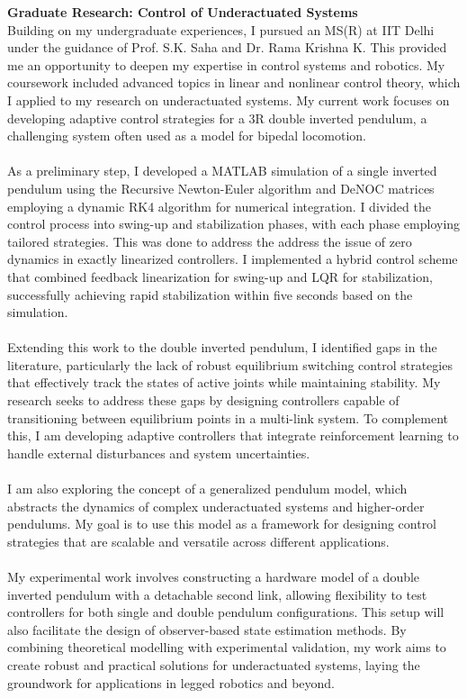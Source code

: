 \documentclass[10pt]{article}
\begin{document}
\textbf{Graduate Research: Control of Underactuated Systems }\\ 
Building on my undergraduate experiences, I pursued an MS(R) at IIT Delhi under the guidance of Prof. S.K. Saha and Dr. Rama Krishna K. This provided me an opportunity to deepen my expertise in control systems and robotics. My coursework included advanced topics in linear and nonlinear control theory, which I applied to my research on underactuated systems. My current work focuses on developing adaptive control strategies for a 3R double inverted pendulum, a challenging system often used as a model for bipedal locomotion.\\ \\
As a preliminary step, I developed a MATLAB simulation of a single inverted pendulum using the Recursive Newton-Euler algorithm and DeNOC matrices employing a dynamic RK4 algorithm for numerical integration. I divided the control process into swing-up and stabilization phases, with each phase employing tailored strategies. This was done to address the address the issue of zero dynamics in exactly linearized controllers. I implemented a hybrid control scheme that combined feedback linearization for swing-up and LQR for stabilization, successfully achieving rapid stabilization within five seconds based on the simulation. \\ \\
Extending this work to the double inverted pendulum, I identified gaps in the literature, particularly the lack of robust equilibrium switching control strategies that effectively track the states of active joints while maintaining stability. My research seeks to address these gaps by designing controllers capable of transitioning between equilibrium points in a multi-link system. To complement this, I am developing adaptive controllers that integrate reinforcement learning to handle external disturbances and system uncertainties. \\ \\
I am also exploring the concept of a generalized pendulum model, which abstracts the dynamics of complex underactuated systems and higher-order pendulums. My goal is to use this model as a framework for designing control strategies that are scalable and versatile across different applications. \\ \\
My experimental work involves constructing a hardware model of a double inverted pendulum with a detachable second link, allowing flexibility to test controllers for both single and double pendulum configurations. This setup will also facilitate the design of observer-based state estimation methods. By combining theoretical modelling with experimental validation, my work aims to create robust and practical solutions for underactuated systems, laying the groundwork for applications in legged robotics and beyond. \\ \\
\end{document}
